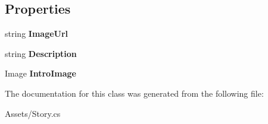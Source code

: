 \subsection*{Properties}
\begin{DoxyCompactItemize}
\item 
string {\bfseries Image\+Url}\hypertarget{classAssets_1_1Story_a051fb3eb1f626f55d54065b7d2985786}{}\label{classAssets_1_1Story_a051fb3eb1f626f55d54065b7d2985786}

\item 
string {\bfseries Description}\hypertarget{classAssets_1_1Story_acec623b2ad2bd5c325bcbb8d19394109}{}\label{classAssets_1_1Story_acec623b2ad2bd5c325bcbb8d19394109}

\item 
Image {\bfseries Intro\+Image}\hypertarget{classAssets_1_1Story_a5d7fd2eb6dca91e01e204488a50206d8}{}\label{classAssets_1_1Story_a5d7fd2eb6dca91e01e204488a50206d8}

\end{DoxyCompactItemize}


The documentation for this class was generated from the following file\+:\begin{DoxyCompactItemize}
\item 
Assets/Story.\+cs\end{DoxyCompactItemize}
